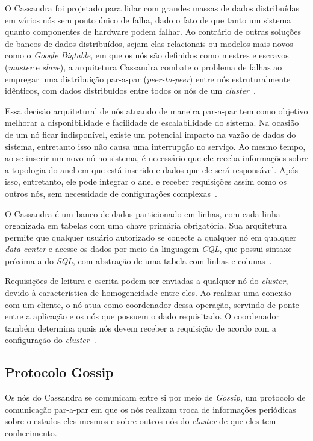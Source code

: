 O Cassandra foi projetado para lidar com grandes massas de dados distribuídas em vários nós sem ponto único de falha, dado o fato de que tanto um sistema quanto componentes de hardware podem falhar.
Ao contrário de outras soluções de bancos de dados distribuídos, sejam elas relacionais ou modelos mais novos como o \emph{Google Bigtable}, em que os nós são definidos como mestres e escravos (\emph{master} e \emph{slave}), a arquitetura Cassandra combate o problema de falhas ao empregar uma distribuição par-a-par (\emph{peer-to-peer}) entre nós estruturalmente idênticos, com dados distribuídos entre todos os nós de um \emph{cluster}~\cite{cassandradocs, cassandraguide}.  

Essa decisão arquitetural de nós atuando de maneira par-a-par tem como objetivo melhorar a disponibilidade e facilidade de escalabilidade do sistema. Na ocasião de um nó ficar indisponível, existe um potencial impacto na vazão de dados do sistema, entretanto isso não causa uma interrupção no serviço. 
Ao mesmo tempo, ao se inserir um novo nó no sistema, é necessário que ele receba informações sobre a topologia do anel em que está inserido e dados que ele será responsável. Após isso, entretanto, ele pode integrar o anel e receber requisições assim como os outros nós, sem necessidade de configurações complexas~\cite{cassandraguide}.

O Cassandra é um banco de dados particionado em linhas, com cada linha organizada em tabelas com uma chave primária obrigatória. Sua arquitetura permite que qualquer usuário autorizado se conecte a qualquer nó em qualquer \emph{data center} e acesse os dados por meio da linguagem \emph{CQL}, que possui sintaxe próxima a do \emph{SQL}, com abstração de uma tabela com linhas e colunas~\cite{cassandradocs}. 

Requisições de leitura e escrita podem ser enviadas a qualquer nó do \emph{cluster}, devido à característica de homogeneidade entre eles. Ao realizar uma conexão com um cliente, o nó atua como coordenador dessa operação, servindo de ponte entre a aplicação e os nós que possuem o dado requisitado. O coordenador também determina quais nós devem receber a requisição de acordo com a configuração do \emph{cluster}~\cite{cassandradocs}. 

\subsection{Protocolo Gossip}

Os nós do Cassandra se comunicam entre si por meio de \emph{Gossip}, um protocolo de comunicação par-a-par em que os nós realizam  troca de informações periódicas sobre o estados eles mesmos e sobre outros nós do \emph{cluster} de que eles tem conhecimento. 

